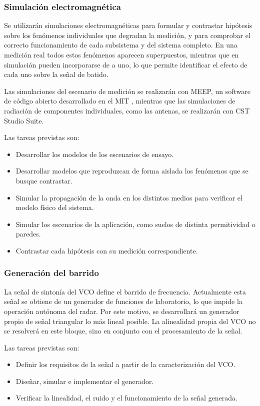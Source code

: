 \documentclass[11pt, a4paper, oneside]{article}
\begin{document}
\subsubsection{Simulación electromagnética}

Se utilizarán simulaciones electromagnéticas para formular y contrastar
hipótesis sobre los fenómenos individuales que degradan la medición, y
para comprobar el correcto funcionamiento de cada subsistema y del
sistema completo. En una medición real todos estos fenómenos aparecen
superpuestos, mientras que en simulación pueden incorporarse de a uno,
lo que permite identificar el efecto de cada uno sobre la señal de
batido.

Las simulaciones del escenario de medición se realizarán con MEEP, un
software de código abierto desarrollado en el MIT \cite{Oskooi2010},
mientras que las simulaciones de radiación de componentes individuales,
como las antenas, se realizarán con CST Studio Suite.

Las tareas previstas son:
\begin{itemize}
  \item Desarrollar los modelos de los escenarios de ensayo.
  \item Desarrollar modelos que reproduzcan de forma aislada los
        fenómenos que se busque contrastar.
  \item Simular la propagación de la onda en los distintos medios para
        verificar el modelo físico del sistema.
  \item Simular los escenarios de la aplicación, como suelos de
        distinta permitividad o paredes.
  \item Contrastar cada hipótesis con su medición correspondiente.
\end{itemize}

\subsubsection{Generación del barrido}

La señal de sintonía del VCO define el barrido de frecuencia.
Actualmente esta señal se obtiene de un generador de funciones de
laboratorio, lo que impide la operación autónoma del radar. Por este
motivo, se desarrollará un generador propio de señal triangular lo más
lineal posible. La alinealidad propia del VCO no se resolverá en este
bloque, sino en conjunto con el procesamiento de la señal.

Las tareas previstas son:
\begin{itemize}
  \item Definir los requisitos de la señal a partir de la
        caracterización del VCO.
  \item Diseñar, simular e implementar el generador.
  \item Verificar la linealidad, el ruido y el funcionamiento de la
        señal generada.
\end{itemize}
\end{document}
